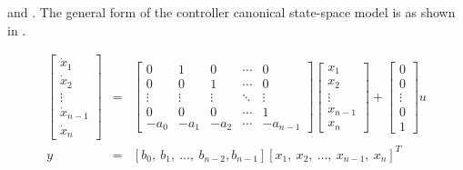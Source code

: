  and . The general form of the
controller canonical state-space model is as shown in
.
\begin{slide}
\label{slide:l5s6} 
\begin{eqnarray*} \left[\begin{array}{c}
  \dot{x}_{1} \\
  \dot{x}_{2} \\
  \vdots \\
  \dot{x}_{n-1} \\
  \dot{x}_n
\end{array}\right] &=& \left[\begin{array}{ccccc}
  0 & 1 & 0 & \cdots & 0 \\
  0 & 0 & 1 & \cdots & 0 \\
  \vdots & \vdots & \vdots & \ddots & \vdots \\
  0 & 0 & 0 & \cdots & 1 \\
  -a_{0} & -a_{1} & -a_{2} & \cdots & -a_{n-1}
\end{array}\right]\left[\begin{array}{c}
  {x}_{1} \\
  {x}_{2} \\
  \vdots \\
  {x}_{n-1} \\
  {x}_{n}
\end{array}\right]+\left[\begin{array}{c}
  0 \\
  0 \\
  \vdots \\
  0 \\
  1
\end{array}\right]u\\
y & = & [b_0,\ b_1,\ \dots,\ b_{n-2}, b_{n-1}][
  {x}_{1},\
  {x}_{2},\
  \ldots,\
  {x}_{n-1},\
  {x}_{n}]^T
\end{eqnarray*}
\end{slide}
